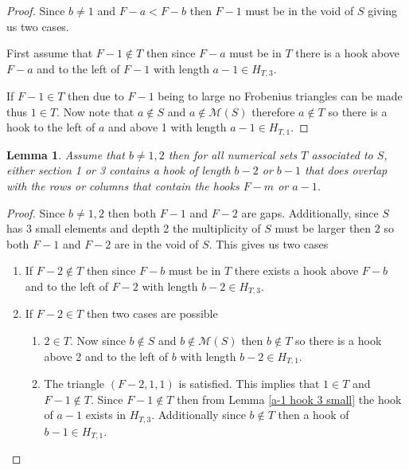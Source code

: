 \documentclass[11pt,letterpaper]{article}
\newtheorem{lem}[thm]{Lemma}
\theoremstyle{definition}
\begin{document}
\begin{proof}
    Since $b\neq 1$ and $F-a<F-b$ then $F-1$ must be in the void of $S$ giving us two cases.

    First assume that $F-1\notin T$ then since $F-a$ must be in $T$ there is a hook above $F-a$ and to the left of $F-1$ with length $a-1\in H_{T,3}$.

    If $F-1\in T$ then due to $F-1$ being to large no Frobenius triangles can be made thus $1\in T$. Now note that $a\notin S$ and $a\notin\mathcal{M}(S)$ therefore $a\notin T$ so there is a hook to the left of $a$ and above 1 with length $a-1\in H_{T,1}$.
\end{proof}





\begin{lem}
    \label{b-2 hook 3 small}
    Assume that $b\neq 1,2$ then for all numerical sets $T$ associated to $S$, either section 1 or 3 contains a hook of length $b-2$ or $b-1$ that does overlap with the rows or columns that contain the hooks $F-m$ or $a-1$. 
\end{lem}

\begin{proof}
    Since $b\neq 1,2$ then both $F-1$ and $F-2$ are gaps. Additionally, since $S$ has 3 small elements and depth 2 the multiplicity of $S$ must be larger then $2$ so both $F-1$ and $F-2$ are in the void of $S$. This gives us two cases

    \begin{enumerate}
        \item If $F-2\notin T$ then since $F-b$ must be in $T$ there exists a hook above $F-b$ and to the left of $F-2$ with length $b-2\in H_{T,3}$.

        \item If $F-2\in T$ then two cases are possible 
                \begin{enumerate}
                    \item $2\in T$. Now since $b\notin S$ and $b\notin\mathcal{M}(S)$ then $b\notin T$ so there is a hook above 2 and to the left of $b$ with length $b-2\in H_{T,1}$.
                    \item The triangle $(F-2,1,1)$ is satisfied. This implies that $1\in T$ and $F-1\notin T$. Since $F-1\notin T$ then from Lemma \ref{a-1 hook 3 small} the hook of $a-1$ exists in $H_{T,3}$. Additionally since $b\notin T$ then a hook of $b-1\in H_{T,1}$.
                \end{enumerate}
    \end{enumerate}
\end{proof}
\end{document}
